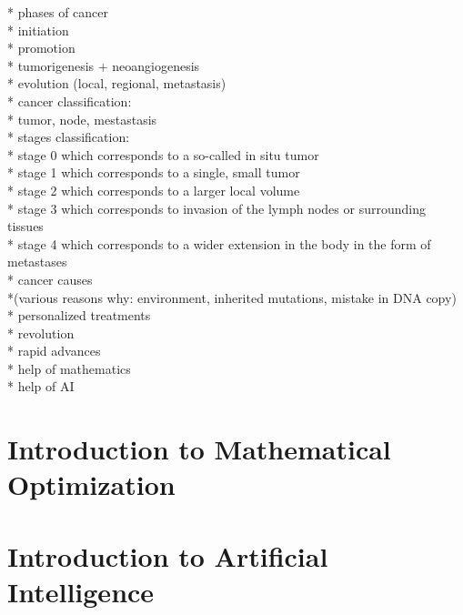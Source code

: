 * phases of cancer\\
  * initiation\\
  * promotion\\
  * tumorigenesis + neoangiogenesis\\
  * evolution (local, regional, metastasis)\\

* cancer classification:\\
  * tumor, node, mestastasis\\
  * stages classification:\\
    * stage 0 which corresponds to a so-called in situ tumor\\
    * stage 1 which corresponds to a single, small tumor\\
    * stage 2 which corresponds to a larger local volume\\
    * stage 3 which corresponds to invasion of the lymph nodes or surrounding tissues\\
    * stage 4 which corresponds to a wider extension in the body in the form of metastases\\

* cancer causes\\
  *(various reasons why: environment, inherited mutations, mistake in DNA copy)\\
 

* personalized treatments\\
  * revolution\\
  * rapid advances\\
  * help of mathematics\\
  * help of AI\\

\section{Introduction to Mathematical Optimization}

\lipsum[8-12]

\section{Introduction to Artificial Intelligence}

\lipsum[13-18]